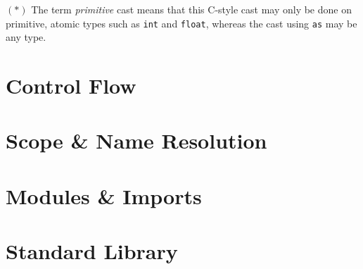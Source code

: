 \documentclass{article}
\begin{document}
    \((\ast)\) The term \textit{primitive} cast means that this C-style cast may only be done on primitive, atomic types such as \texttt{int} and \texttt{float}, whereas the cast using \texttt{as} may be any type.

    \section{Control Flow}

    \section{Scope \& Name Resolution}\label{sec:scope}

    \section{Modules \& Imports}

    \section{Standard Library}
\end{document}
